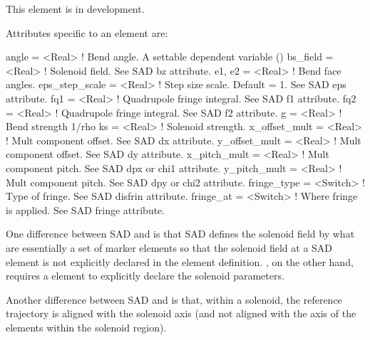 {This element is in development.

Attributes specific to an  element are:
\begin{example}
  angle           = <Real>    ! Bend angle. A settable dependent variable ()
  bs_field        = <Real>    ! Solenoid field. See SAD bz attribute.
  e1, e2          = <Real>    ! Bend face angles.
  eps_step_scale  = <Real>    ! Step size scale. Default = 1. See SAD eps attribute.
  fq1             = <Real>    ! Quadrupole fringe integral. See SAD f1 attribute.
  fq2             = <Real>    ! Quadrupole fringe integral. See SAD f2 attribute.
  g               = <Real>    ! Bend strength 1/rho
  ks              = <Real>    ! Solenoid strength. 
  x_offset_mult   = <Real>    ! Mult component offset. See SAD dx attribute.
  y_offset_mult   = <Real>    ! Mult component offset. See SAD dy attribute.
  x_pitch_mult    = <Real>    ! Mult component pitch. See SAD dpx or chi1 attribute.
  y_pitch_mult    = <Real>    ! Mult component pitch. See SAD dpy or chi2 attribute.
  fringe_type     = <Switch>  ! Type of fringe. See SAD disfrin attribute.
  fringe_at       = <Switch>  ! Where fringe is applied. See SAD fringe attribute.
\end{example}


One difference between SAD and \bmad is that SAD defines the solenoid
field by what are essentially a set of marker elements so that the
solenoid field at a SAD  element is not explicitly declared
in the  element definition. \bmad, on the other hand,
requires a  element to explicitly declare the solenoid
parameters.

Another difference between SAD and \bmad is that, within a solenoid,
the reference trajectory is aligned with the solenoid axis (and not
aligned with the axis of the elements within the solenoid region).

}
